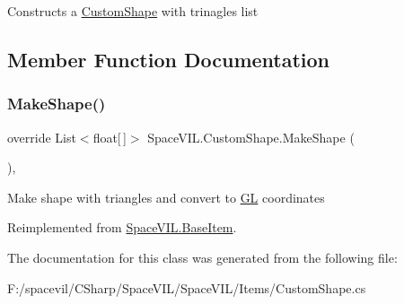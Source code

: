 Constructs a \mbox{\hyperlink{class_space_v_i_l_1_1_custom_shape}{Custom\+Shape}} with trinagles list 



\subsection{Member Function Documentation}
\mbox{\label{class_space_v_i_l_1_1_custom_shape_aa8a1eb76ab361eea35540787f79fac6f}} 
\subsubsection{\texorpdfstring{Make\+Shape()}{MakeShape()}}
{\footnotesize\ttfamily override List$<$float\mbox{[}$\,$\mbox{]}$>$ Space\+V\+I\+L.\+Custom\+Shape.\+Make\+Shape (\begin{DoxyParamCaption}{ }\end{DoxyParamCaption})\hspace{0.3cm}{\ttfamily [inline]}, {\ttfamily [virtual]}}



Make shape with triangles and convert to \mbox{\hyperlink{namespace_g_l}{GL}} coordinates 



Reimplemented from \mbox{\hyperlink{class_space_v_i_l_1_1_base_item_ac111d3d8cef36f406aa11862cefab9e2}{Space\+V\+I\+L.\+Base\+Item}}.



The documentation for this class was generated from the following file\+:\begin{DoxyCompactItemize}
\item 
F\+:/spacevil/\+C\+Sharp/\+Space\+V\+I\+L/\+Space\+V\+I\+L/\+Items/Custom\+Shape.\+cs\end{DoxyCompactItemize}
